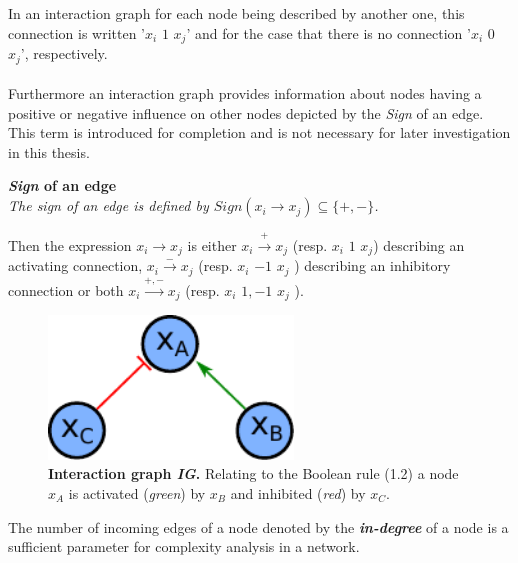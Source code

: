 In an interaction graph for each node being described by another one, this connection is written '$x_{i}$ $1$ $x_{j}$' and for the case that there is no connection '$x_{i}$ $0$ $x_{j}$', respectively.
\\\\
Furthermore an interaction graph provides information about nodes having a positive or negative influence on other nodes depicted by the \textit{Sign} of an edge. This term is introduced for completion and is not necessary for later investigation in this thesis. 

\begin{defn}\textbf{\textit{Sign} of an edge}\\
\textit{The sign of an edge is defined by $Sign(x_{i}\rightarrow x_{j}) \subseteq \{+,-\}$.}
\end{defn}

Then the expression $x_{i}\rightarrow x_{j}$ is either $x_{i}\xrightarrow{+}  x_{j}$ (resp. $x_{i}$ $1$ $x_{j}$) describing an activating connection, $x_{i}\xrightarrow{-} x_{j}$ (resp. $x_{i}$ $-1$ $x_{j}$ ) describing an inhibitory connection or both $x_{i}\xrightarrow{+,-} x_{j}$ (resp. $x_{i}$ $1,-1$ $x_{j}$ ).\\

\begin{figure}
\begin{minipage}{0.4\linewidth}
\includegraphics[width=0.58\textwidth]{./Bilder/Interactiongraph1.pdf}
\end{minipage}
\caption[Interaction graph \textit{G}]{\textbf{Interaction graph \textit{IG}. }Relating to the Boolean rule (1.2) a node $x_{A}$ is activated (\textit{green}) by $x_{B}$ and inhibited (\textit{red}) by $x_{C}$.}
\label{fig:7}
\end{figure}

 
The number of incoming edges of a node denoted by the \textit{\textbf{in-degree}} of a node is a sufficient parameter for complexity analysis in a network. 

